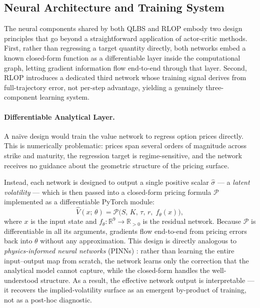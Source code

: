 \subsection{Neural Architecture and Training System}
\label{sec:architecture}

The neural components shared by both QLBS and RLOP embody two design
principles that go beyond a straightforward application of actor-critic
methods.
First, rather than regressing a target quantity directly, both networks embed
a known closed-form function as a differentiable layer inside the
computational graph, letting gradient information flow end-to-end through
that layer.
Second, RLOP introduces a dedicated third network whose training signal
derives from full-trajectory error, not per-step advantage, yielding a
genuinely three-component learning system.

\paragraph{Differentiable Analytical Layer.}
A na\"ive design would train the value network to regress option prices
directly.
This is numerically problematic: prices span several orders of magnitude
across strike and maturity, the regression target is regime-sensitive, and
the network receives no guidance about the geometric structure of the
pricing surface.

Instead, each network is designed to output a single positive scalar
$\hat\sigma$ --- a \emph{latent volatility} --- which is then passed into
a closed-form pricing formula $\mathcal{P}$ implemented as a differentiable
PyTorch module:
\begin{equation}
  \hat{V}(x;\,\theta)
  = \mathcal{P}\!\bigl(S,\,K,\,\tau,\,r,\;f_\theta(x)\bigr),
  \label{eq:latent-vol}
\end{equation}
where $x$ is the input state and $f_\theta:\mathbb{R}^9\to\mathbb{R}_{>0}$
is the residual network.
Because $\mathcal{P}$ is differentiable in all its arguments, gradients
flow end-to-end from pricing errors back into $\theta$ without any
approximation.
This design is directly analogous to \emph{physics-informed neural networks}
(PINNs) \cite{raissi2019physics}: rather than learning the entire
input--output map from scratch, the network learns only the correction
that the analytical model cannot capture, while the closed-form handles the
well-understood structure.
As a result, the effective network output is interpretable --- it recovers
the implied-volatility surface as an emergent by-product of training,
not as a post-hoc diagnostic.

